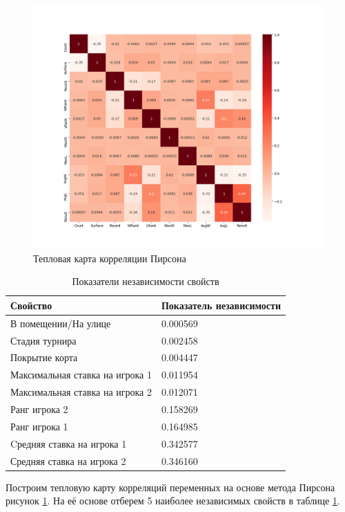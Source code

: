 \begin{figure}[ht]
	\centering
	\includegraphics[width=.8\textwidth]{master_img/heatmap.png}
	\caption{Тепловая карта корреляции Пирсона}
	\label{fig03}
\end{figure}
\begin{table}[!h]
	\caption{\label{tab:tablepearson}Показатели независимости свойств}
	\begin{center}
		
		\begin{tabular}{|l|l|}
			
			\hline
			
			Свойство& Показатель независимости \\
			
			\hline 
			
			В помещении/На улице & 0.000569 \\ \hline
			Стадия турнира & 0.002458 \\ \hline
			Покрытие корта & 0.004447 \\ \hline
			Максимальная ставка на игрока 1 & 0.011954 \\ \hline
			Максимальная ставка на игрока 2 & 0.012071 \\ \hline
			Ранг игрока 2 & 0.158269 \\ \hline
			Ранг игрока 1 & 0.164985 \\ \hline
			Cредняя ставка на игрока 1 & 0.342577 \\ \hline
			Средняя ставка на игрока 2 & 0.346160 \\ \hline
		\end{tabular}
		
	\end{center}
	
\end{table}
Построим тепловую карту корреляций переменных на основе метода Пирсона рисунок \ref{fig03}.
На её основе отберем 5 наиболее независимых свойств в таблице \ref{tab:tablepearson}.


